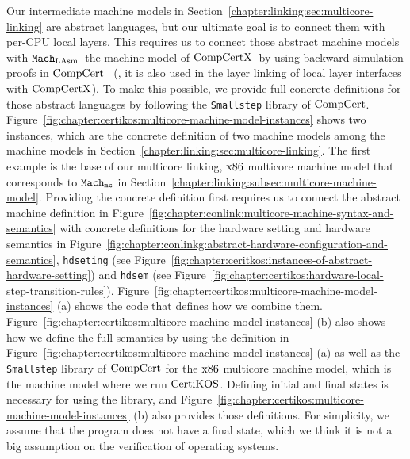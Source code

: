 Our intermediate machine models in Section~\ref{chapter:linking:sec:multicore-linking} are abstract languages, but our ultimate goal is to connect them with per-CPU local layers. 
This requires us to connect those abstract machine models with ${\mathrm{\texttt{Mach}}}_{\mathrm{LAsm}}$--the machine model of $\mathrm{CompCertX}$--by using backward-simulation proofs in $\mathrm{CompCert}$~\cite{leroy06} (\ie, it is also used in the layer linking of local layer interfaces  with $\mathrm{CompCertX}$).
To make  this possible,
we provide  full concrete definitions for those abstract languages
by following the \lstinline$Smallstep$ library of $\mathrm{CompCert}$.
Figure~\ref{fig:chapter:certikos:multicore-machine-model-instances}
shows two instances, which are the concrete definition 
of two machine models among the machine models in Section~\ref{chapter:linking:sec:multicore-linking}.
The first example is the base of our multicore linking, $\mathrm{x86}$ multicore machine model that corresponds to ${{{{\mathrm{\texttt{Mach}}}}_{\mathrm{\texttt{mc}}}}}$ in Section~\ref{chapter:linking:subsec:multicore-machine-model}.
Providing the concrete definition first requires 
us to connect the abstract machine definition in Figure~\ref{fig:chapter:conlink:multicore-machine-syntax-and-semantics}
with concrete definitions for the hardware setting and  hardware semantics in Figure~\ref{fig:chapter:conlinkg:abstract-hardware-configuration-and-semantics}, \lstinline$hdseting$ (see Figure~\ref{fig:chapter:ceritkos:instances-of-abstract-hardware-setting}) and \lstinline$hdsem$ (see Figure~\ref{fig:chapter:certikos:hardware-local-step-transition-rules}). 
Figure~\ref{fig:chapter:certikos:multicore-machine-model-instances} (a) shows 
the code that defines how we combine them.
Figure~\ref{fig:chapter:certikos:multicore-machine-model-instances} (b) 
also shows how we define the full semantics by using the  definition in Figure~\ref{fig:chapter:certikos:multicore-machine-model-instances} (a) as well as the \lstinline$Smallstep$ library of $\mathrm{CompCert}$  for the $\mathrm{x86}$ multicore machine model, which is the machine model 
where we run $\mathrm{CertiKOS}$. 
Defining initial and final states is necessary for using the library, and Figure~\ref{fig:chapter:certikos:multicore-machine-model-instances} (b)  also provides those definitions.
For simplicity, we assume that the program does not have a final state, which we think it is not a big assumption 
on the verification of operating systems.

